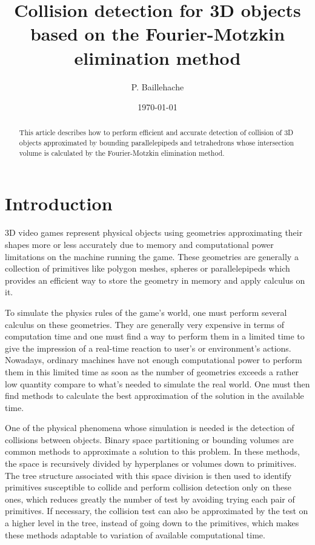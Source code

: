 \documentclass[12pt, a4paper]{article}
\begin{document}
\title{Collision detection for 3D objects based on the Fourier-Motzkin elimination method}
\author{P. Baillehache}
\date{\today}
\maketitle

\begin{abstract}
This article describes how to perform efficient and accurate detection of collision of 3D objects approximated by bounding parallelepipeds and tetrahedrons whose intersection volume is calculated by the Fourier-Motzkin elimination method.
\end{abstract}

\section{Introduction}

3D video games represent physical objects using geometries approximating their shapes more or less accurately due to memory and computational power limitations on the machine running the game. These geometries are generally a collection of primitives like polygon meshes, spheres or parallelepipeds which provides an efficient way to store the geometry in memory and apply calculus on it. 

To simulate the physics rules of the game's world, one must perform several calculus on these geometries. They are generally very expensive in terms of computation time and one must find a way to perform them in a limited time to give the impression of a real-time reaction to user's or environment's actions. Nowadays, ordinary machines have not enough computational power to perform them in this limited time as soon as the number of geometries exceeds a rather low quantity compare to what's needed to simulate the real world. One must then find methods to calculate the best approximation of the solution in the available time.

One of the physical phenomena whose simulation is needed is the detection of collisions between objects. Binary space partitioning or bounding volumes are common methods to approximate a solution to this problem. In these methods, the space is recursively divided by hyperplanes or volumes down to primitives. The tree structure associated with this space division is then used to identify primitives susceptible to collide and perform collision detection only on these ones, which reduces greatly the number of test by avoiding trying each pair of primitives. If necessary, the collision test can also be approximated by the test on a higher level in the tree, instead of going down to the primitives, which makes these methods adaptable to variation of available computational time.
\end{document}
